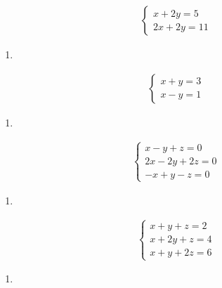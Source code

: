 \documentclass[letterpaper,10pt,italian]{jupyterBook}
\begin{document}
\begin{equation*}
\begin{split}
   \begin{cases}
   x + 2y = 5 \\
   2x + 2y = 11
   \end{cases}
\end{split}
\end{equation*}\begin{enumerate}
%
\setcounter{enumi}{3}
\item {} 
\end{enumerate}
\begin{equation*}
\begin{split}
   \begin{cases}
   x + y = 3 \\
   x - y = 1
   \end{cases}
\end{split}
\end{equation*}\begin{enumerate}
%
\setcounter{enumi}{4}
\item {} 
\end{enumerate}
\begin{equation*}
\begin{split}
   \begin{cases}
   x - y + z = 0 \\
   2x - 2y + 2z = 0 \\
   -x + y - z = 0
   \end{cases}
\end{split}
\end{equation*}\begin{enumerate}
%
\setcounter{enumi}{5}
\item {} 
\end{enumerate}
\begin{equation*}
\begin{split}
   \begin{cases}
   x + y + z = 2 \\
   x + 2y + z = 4 \\
   x + y + 2z = 6
   \end{cases}
\end{split}
\end{equation*}\begin{enumerate}
%
\setcounter{enumi}{6}
\item {} 
\end{enumerate}
\end{document}
